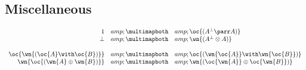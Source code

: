 \subsection{Miscellaneous}\label{miscellaneous}

\(\begin{array}{rcl}
  \one &amp;\linequiv&amp; \oc{(A\orth\parr A)} \\
  \bot &amp;\linequiv&amp; \wn{(A\orth\tens A)} \\
\\
  \oc{\wn{(\oc{A}\with\oc{B})}} &amp;\linequiv&amp; \oc{(\wn{\oc{A}}\with\wn{\oc{B}})} \\
  \wn{\oc{(\wn{A}\plus\wn{B})}} &amp;\linequiv&amp; \wn{(\oc{\wn{A}}\plus\oc{\wn{B}})}
\end{array}\)

